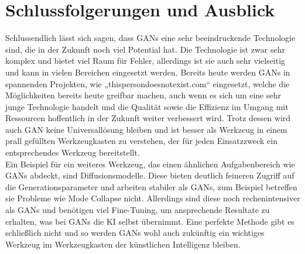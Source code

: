 \chapter{Schlussfolgerungen und Ausblick}

\noindent Schlussendlich lässt sich sagen, dass \acp{GAN} eine sehr beeindruckende Technologie sind, die in der Zukunft noch viel Potential hat. Die Technologie ist zwar sehr komplex und bietet viel Raum für Fehler, allerdings ist sie auch sehr vielseitig und kann in vielen Bereichen eingesetzt werden. Bereits heute werden \acp{GAN} in spannenden Projekten, wie „thispersondoesnotexist.com“ eingesetzt, welche die Möglichkeiten bereits heute greifbar machen, auch wenn es sich um eine sehr junge Technologie handelt und die Qualität sowie die Effizienz im Umgang mit Ressourcen hoffentlich in der Zukunft weiter verbessert wird. Trotz dessen wird auch \ac{GAN} keine Universallösung bleiben und ist besser als Werkzeug in einem prall gefüllten Werkzeugkasten zu verstehen, der für jeden Einsatzzweck ein entsprechendes Werkzeug bereitstellt. \\

\noindent Ein Beispiel für ein weiteres Werkzeug, das einen ähnlichen Aufgabenbereich wie \acp{GAN} abdeckt, sind Diffusionsmodelle. Diese bieten deutlich feineren Zugriff auf die Generationsparameter und arbeiten stabiler als \acp{GAN}, zum Beispiel betreffen sie Probleme wie Mode Collapse nicht. Allerdings sind diese noch rechenintensiver als \acp{GAN} und benötigen viel Fine-Tuning, um ansprechende Resultate zu erhalten, was bei \acp{GAN} die KI selbst übernimmt. Eine perfekte Methode gibt es schließlich nicht und so werden \acp{GAN} wohl auch zukünftig ein wichtiges Werkzeug im Werkzeugkasten der künstlichen Intelligenz bleiben.\\

\noindent 

\newpage
